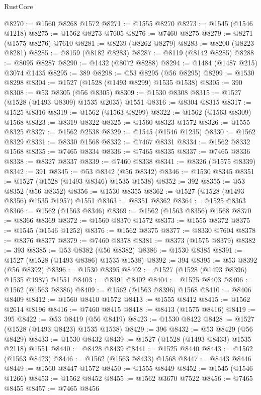 \begin{lexlean}{RustCore}
\begin{coremodule}
@8270 := @1560 @8268 @1572
@8271 := @1555 @8270
@8273 := @1545 (@1546 @1218)
@8275 := @1562 @8273 @7605
@8276 := @7460 @8275
@8279 := @8271 (@1575 @8276) @7610
@8281 := @8239 (@8262 @8279)
@8283 := @8200 (@8223 @8281)
@8285 := @8159 (@8182 @8283)
@8287 := @8119 (@8142 @8285)
@8288 := @8095 @8287
@8290 := @1432 (@8072 @8288)
@8294 := @1484 (@1487 @215) @3074 @1435
@8295 := 389
@8298 := @53 @8295 (@56 @8295)
@8299 := @1530 @8298
@8304 := @1527 (@1528 (@1493 @8299) @1535 @1538)
@8305 := 390
@8308 := @53 @8305 (@56 @8305)
@8309 := @1530 @8308
@8315 := @1527 (@1528 (@1493 @8309) @1535 @2035) @1551
@8316 := @8304 @8315
@8317 := @1525 @8316
@8319 := @1562 (@1563 @8299)
@8322 := @1562 (@1563 @8309) @1568
@8323 := @8319 @8322
@8325 := @1560 @8323 @1572
@8326 := @1555 @8325
@8327 := @1562 @2538
@8329 := @1545 (@1546 @1235)
@8330 := @1562 @8329
@8331 := @8330 @1568
@8332 := @7467 @8331
@8334 := @1562 @8332 @1568
@8335 := @7465 @8334
@8336 := @7465 @8335
@8337 := @7465 @8336
@8338 := @8327 @8337
@8339 := @7460 @8338
@8341 := @8326 (@1575 @8339)
@8342 := 391
@8345 := @53 @8342 (@56 @8342)
@8346 := @1530 @8345
@8351 := @1527 (@1528 (@1493 @8346) @1535 @1538)
@8352 := 392
@8355 := @53 @8352 (@56 @8352)
@8356 := @1530 @8355
@8362 := @1527 (@1528 (@1493 @8356) @1535 @1957) @1551
@8363 := @8351 @8362
@8364 := @1525 @8363
@8366 := @1562 (@1563 @8346)
@8369 := @1562 (@1563 @8356) @1568
@8370 := @8366 @8369
@8372 := @1560 @8370 @1572
@8373 := @1555 @8372
@8375 := @1545 (@1546 @1252)
@8376 := @1562 @8375
@8377 := @8330 @7604
@8378 := @8376 @8377
@8379 := @7460 @8378
@8381 := @8373 (@1575 @8379)
@8382 := 393
@8385 := @53 @8382 (@56 @8382)
@8386 := @1530 @8385
@8391 := @1527 (@1528 (@1493 @8386) @1535 @1538)
@8392 := 394
@8395 := @53 @8392 (@56 @8392)
@8396 := @1530 @8395
@8402 := @1527 (@1528 (@1493 @8396) @1535 @1987) @1551
@8403 := @8391 @8402
@8404 := @1525 @8403
@8406 := @1562 (@1563 @8386)
@8409 := @1562 (@1563 @8396) @1568
@8410 := @8406 @8409
@8412 := @1560 @8410 @1572
@8413 := @1555 @8412
@8415 := @1562 @2614 @8196
@8416 := @7460 @8415
@8418 := @8413 (@1575 @8416)
@8419 := 395
@8422 := @53 @8419 (@56 @8419)
@8423 := @1530 @8422
@8428 := @1527 (@1528 (@1493 @8423) @1535 @1538)
@8429 := 396
@8432 := @53 @8429 (@56 @8429)
@8433 := @1530 @8432
@8439 := @1527 (@1528 (@1493 @8433) @1535 @2118) @1551
@8440 := @8428 @8439
@8441 := @1525 @8440
@8443 := @1562 (@1563 @8423)
@8446 := @1562 (@1563 @8433) @1568
@8447 := @8443 @8446
@8449 := @1560 @8447 @1572
@8450 := @1555 @8449
@8452 := @1545 (@1546 @1266)
@8453 := @1562 @8452
@8455 := @1562 @3670 @7522
@8456 := @7465 @8455
@8457 := @7465 @8456

\end{coremodule}
\end{lexlean}
